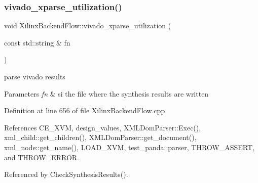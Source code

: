 \subsubsection{\texorpdfstring{vivado\+\_\+xparse\+\_\+utilization()}{vivado\_xparse\_utilization()}}
{\footnotesize\ttfamily void Xilinx\+Backend\+Flow\+::vivado\+\_\+xparse\+\_\+utilization (\begin{DoxyParamCaption}\item[{const std\+::string \&}]{fn }\end{DoxyParamCaption})\hspace{0.3cm}{\ttfamily [protected]}}



parse vivado results 


\begin{DoxyParams}{Parameters}
{\em fn} & si the file where the synthesis results are written \\
\hline
\end{DoxyParams}


Definition at line 656 of file Xilinx\+Backend\+Flow.\+cpp.



References C\+E\+\_\+\+X\+VM, design\+\_\+values, X\+M\+L\+Dom\+Parser\+::\+Exec(), xml\+\_\+child\+::get\+\_\+children(), X\+M\+L\+Dom\+Parser\+::get\+\_\+document(), xml\+\_\+node\+::get\+\_\+name(), L\+O\+A\+D\+\_\+\+X\+VM, test\+\_\+panda\+::parser, T\+H\+R\+O\+W\+\_\+\+A\+S\+S\+E\+RT, and T\+H\+R\+O\+W\+\_\+\+E\+R\+R\+OR.



Referenced by Check\+Synthesis\+Results().

